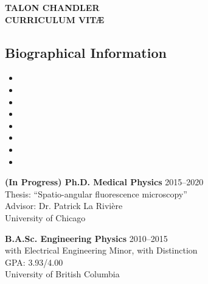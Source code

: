 \documentclass[12pt,letterpaper]{article}
\begin{document}
\begin{center}
{\Large \textbf{TALON CHANDLER}}\\
{\textbf{CURRICULUM VIT\AE}}\\
\end{center}
\vspace{-1em}

\subsection*{Biographical Information}
\begin{itemize}[noitemsep]
\item[]  
\item[]  
\item[]  
\item[] \itab{} 
\item[] \itab{} 
\item[]  
\item[]  
\item[]  
\end{itemize}

\begin{etaremune}[labelsep=0.035\textwidth]
\item
  \textbf{(In Progress) Ph.D. Medical Physics} \hfill 2015--2020\\
  Thesis: ``Spatio-angular fluorescence microscopy''\\
  Advisor: Dr. Patrick La Rivi\`ere \\
  University of Chicago
\item
  \textbf{B.A.Sc. Engineering Physics} \hfill 2010--2015\\
  with Electrical Engineering Minor, with Distinction\\
  GPA: 3.93/4.00\\
  University of British Columbia
\end{etaremune}

\nocite{*}
\setlength{}
\printbibliography[heading=none, type=article, sorting=ynt]
\end{document}

